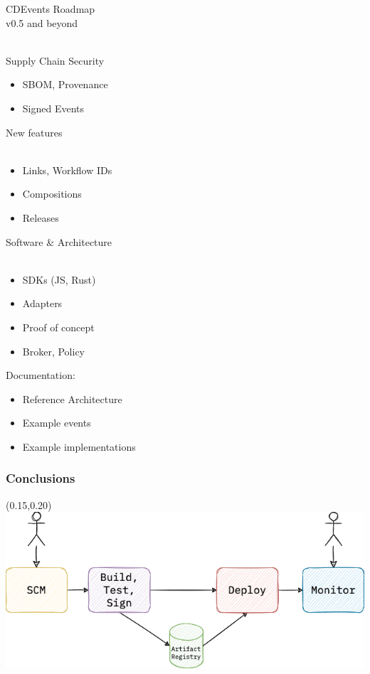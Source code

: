 \documentclass[aspectratio=169,11pt,hyperref={colorlinks=true}]{beamer}
\begin{document}
\begin{stripedframe}%
  {%
  CDEvents Roadmap \\
  v0.5 and beyond \\
  ~
  }%
  {%
  Supply Chain Security
  \begin{itemize}
    \item SBOM, Provenance
  \end{itemize}
  \begin{itemize}
    \item Signed Events
  \end{itemize}
  }%
  {%
  New features \\
  ~
  \begin{itemize}
    \item Links, Workflow IDs
    \item Compositions
    \item Releases
  \end{itemize}
  }%
  {%
  Software \& Architecture\\
  ~
  \begin{itemize}
    \item SDKs (JS, Rust)
    \item Adapters
    \item Proof of concept
    \item Broker, Policy
  \end{itemize}
  }%
  {%
  Documentation:
  \begin{itemize}
    \item Reference Architecture
    \item Example events
    \item Example implementations
  \end{itemize}
  }%
\end{stripedframe}

\begin{grayframe}
  \frametitle{Conclusions}
  \begin{textblock*}{0.70\paperwidth}(0.15\paperwidth,0.20\paperheight)
    \includegraphics[width=0.70\paperwidth]{img/cdevents-1-no-events.png}
  \end{textblock*}
\end{grayframe}
\end{document}
